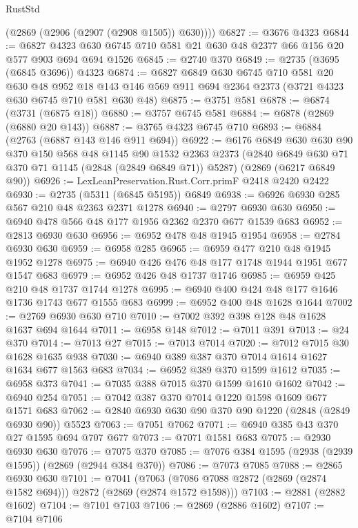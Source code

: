 \begin{lexlean}{RustStd}
\begin{coremodule}
{\begin{coremodule}
{{{{{{{{{{{{        (@2869 (@2906 (@2907 (@2908 @1505)) @630))))
@6827 := @3676 @4323
@6844 := @6827 @4323 @630 @6745 @710 @581 @21 @630 @48 @2377 @66 @156 @20 @577 @903 @694 @694 @1526
@6845 := @2740 @370
@6849 := @2735 (@3695 (@6845 @3696)) @4323
@6874 := @6827
    @6849
    @630
    @6745
    @710
    @581
    @20
    @630
    @48
    @952
    @18
    @143
    @146
    @569
    @911
    @694
    @2364
    @2373
    (@3721 @4323 @630 @6745 @710 @581 @630 @48)
@6875 := @3751 @581
@6878 := @6874 (@3731 (@6875 @18))
@6880 := @3757 @6745 @581
@6884 := @6878 (@2869 (@6880 @20 @143))
@6887 := @3765 @4323 @6745 @710
@6893 := @6884 (@2763 (@6887 @143 @146 @911 @694))
@6922 := @6176
    @6849
    @630
    @630
    @90
    @370
    @150
    @568
    @48
    @1145
    @90
    @1532
    @2363
    @2373
    (@2840 @6849 @630 @71 @370 @71 @1145 (@2848 (@2849 @6849 @71)) @5287)
    (@2869 (@6217 @6849 @90))
@6926 := LexLeanPreservation.Rust.Corr.primF @2418 @2420 @2422
@6930 := @2735 (@5311 (@6845 @5195)) @6849
@6938 := @6926 @6930 @285 @567 @210 @48 @2363 @2371 @1278
@6940 := @2797 @6930 @630
@6950 := @6940 @478 @566 @48 @177 @1956 @2362 @2370 @677 @1539 @683
@6952 := @2813 @6930 @630
@6956 := @6952 @478 @48 @1945 @1954
@6958 := @2784 @6930 @630
@6959 := @6958 @285
@6965 := @6959 @477 @210 @48 @1945 @1952 @1278
@6975 := @6940 @426 @476 @48 @177 @1748 @1944 @1951 @677 @1547 @683
@6979 := @6952 @426 @48 @1737 @1746
@6985 := @6959 @425 @210 @48 @1737 @1744 @1278
@6995 := @6940 @400 @424 @48 @177 @1646 @1736 @1743 @677 @1555 @683
@6999 := @6952 @400 @48 @1628 @1644
@7002 := @2769 @6930 @630 @710
@7010 := @7002 @392 @398 @128 @48 @1628 @1637 @694 @1644
@7011 := @6958 @148
@7012 := @7011 @391
@7013 := @24 @370
@7014 := @7013 @27
@7015 := @7013 @7014
@7020 := @7012 @7015 @30 @1628 @1635 @938
@7030 := @6940 @389 @387 @370 @7014 @1614 @1627 @1634 @677 @1563 @683
@7034 := @6952 @389 @370 @1599 @1612
@7035 := @6958 @373
@7041 := @7035 @388 @7015 @370 @1599 @1610 @1602
@7042 := @6940 @254
@7051 := @7042 @387 @370 @7014 @1220 @1598 @1609 @677 @1571 @683
@7062 := @2840 @6930 @630 @90 @370 @90 @1220 (@2848 (@2849 @6930 @90)) @5523
@7063 := @7051 @7062
@7071 := @6940 @385 @43 @370 @27 @1595 @694 @707 @677
@7073 := @7071 @1581 @683
@7075 := @2930 @6930 @630
@7076 := @7075 @370
@7085 := @7076 @384 @1595 (@2938 (@2939 @1595)) (@2869 (@2944 @384 @370))
@7086 := @7073 @7085
@7088 := @2865 @6930 @630
@7101 := @7041
    (@7063 (@7086 @7088 @2872 (@2869 (@2874 @1582 @694))) @2872 (@2869 (@2874 @1572 @1598)))
@7103 := @2881 (@2882 @1602)
@7104 := @7101 @7103
@7106 := @2869 (@2886 @1602)
@7107 := @7104 @7106
}}}}}}}}}}}}
\end{coremodule}}
\end{coremodule}
\end{lexlean}
